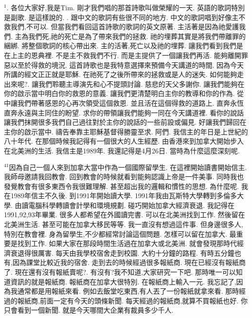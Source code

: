 \documentclass{book}
\begin{document}
$^{1}$.
各位大家好,我是Tim.
剛才我們唱的那首詩歌叫做榮耀的一天.
英語的歌詞特別是副歌.
是這樣說的.
.
跟中文的歌詞有些很不同的地方.
中文的歌詞唱到好像主不救我們,不可以.
但當我們看回這首詩歌的歌詞的英文原著.
主活著是因為祂愛護我們.
主為我們死,祂的死亡是為了帶來我們的拯救.
祂的埋葬其實是將我們帶離罪的綑綁.
將整個歌詞的核心帶出來.
主的活著,死亡以及祂的埋葬.
讓我們看到我們是在上主的恩典裡.
不是主不救我們不行.
而是主提供了一個讓我們再活.
能夠離開罪惡以至於得救的境況.
這首詩歌也是我特意選擇來預備今天講道的時間.
因為今天所講的經文正正就是耶穌.
在祂死了之後所帶來的拯救或是人的迷失.
如何能夠走出來呢?.
讓我們聆聽主導演先和心不提頭討論.
慈悲的天父多謝你.
讓我們能夠在你的啟示當中明白你的救恩的意義.
讓我們更清楚明白主你的教導和你的作為.
從中讓我們帶著感恩的心再次領受這個救恩.
並且活在這個得救的道路上.
直奔永恆直奔永遠與主同住的盼望.
求你的帶領讓我們能夠一同在今天講道裡.
看你的說話讓我們抹開很多我們自己過往對於主你的說話的一些前設或偏見.
好讓我們歸回在主你的啟示當中.
禱告奉靠主耶穌基督得勝靈至求.
阿們.
我信主的年日是上世紀的八十年代.
在那個時候我記得有一個很大的人生經歷.
由香港來到加拿大開始步入在北美洲的生活.
我信主是1989年.
我還記得是4月26日.
當時為什麼這麼深刻呢.

$^{41}$因為自己一個人來到加拿大當中作為一個國際留學生.
在這裡開始讀書開始信主.
我師母邀請我回教會.
回到教會的時候就看到能夠認識上帝是一件美事.
同時我也發覺教會有很多東西令我很難理解.
甚至超出我的邏輯和慣性的思想.
為什麼呢.
我在1989年信主不久後.
到1991年開始讀大學.
1991年我由瓦斯特大學轉到多倫多大學.
由讀電腦科學轉讀會計學和環境規劃.
碰巧開始加拿大經濟衰退.
我記得在1991,92,93年畢業.
很多人都希望在外國讀完書.
可以在北美洲找到工作.
然後留在北美洲生活.
甚至可能在加拿大移民等等.
我一直沒有想過這件事.
但身邊很多人,特別在教會裡.
身為留學生,不少都經常討論這個問題.
怎樣可以留在加拿大.
最重要是找到工作.
如果大家在那段時間生活過在加拿大或北美洲.
就會發現那時代經濟衰退得很厲害.
每天由我學校宿舍走到校園.
大約十分鐘的路程.
有時五分鐘也有,因為課堂比較近我的宿舍.
走到去的時候經過很多報紙商.
現在已經沒有報紙商了.
現在還有沒有報紙賣呢?.
有沒有?我不知道,大家研究一下吧.
那時唯一可以知道資訊的就是報紙商.
報紙商在加拿大很特別.
在報紙商上輸入一元.
我忘記了,因為我通常都是用報紙來看.
例如去飯堂吃東西,有人丟了一份報紙就拿來看.
那時經過的報紙商,前面一定有今天的頭條新聞.
每天經過的報紙商,就算不買報紙也好.
你只會看到一個新聞.
就是今天哪間大企業有裁員多少千人.
\end{document}
